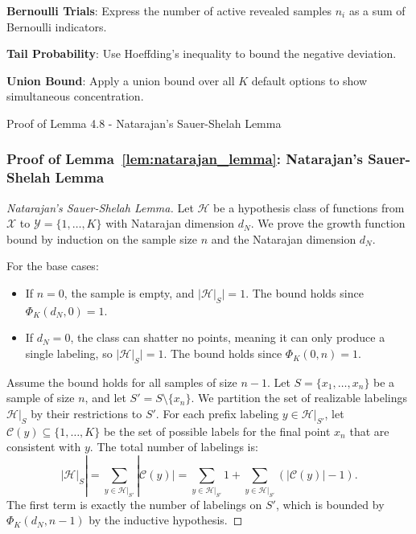 \begin{guideblock}
\item \textbf{Bernoulli Trials}: Express the number of active revealed samples $n_i$ as a sum of Bernoulli indicators.
\item \textbf{Tail Probability}: Use Hoeffding's inequality to bound the negative deviation.
\item \textbf{Union Bound}: Apply a union bound over all $K$ default options to show simultaneous concentration.
\end{guideblock}


\begin{sourceblock}{Proof of Lemma 4.8 - Natarajan's Sauer-Shelah Lemma}
\subsubsection*{Proof of Lemma~\ref{lem:natarajan_lemma}: Natarajan's Sauer-Shelah Lemma}
\label{app:proof_natarajan_lemma}
\begin{proof}[Natarajan's Sauer-Shelah Lemma]
Let $\mathcal{H}$ be a hypothesis class of functions from $\mathcal{X}$ to $\mathcal{Y} = \{1, \dots, K\}$ with Natarajan dimension $d_N$. We prove the growth function bound by induction on the sample size $n$ and the Natarajan dimension $d_N$.

For the base cases:
\begin{itemize}
    \item If $n = 0$, the sample is empty, and $|\mathcal{H}|_S| = 1$. The bound holds since $\Phi_K(d_N, 0) = 1$.
    \item If $d_N = 0$, the class can shatter no points, meaning it can only produce a single labeling, so $|\mathcal{H}|_S| = 1$. The bound holds since $\Phi_K(0, n) = 1$.
\end{itemize}

Assume the bound holds for all samples of size $n - 1$. Let $S = \{x_1, \dots, x_n\}$ be a sample of size $n$, and let $S' = S \setminus \{x_n\}$. We partition the set of realizable labelings $\mathcal{H}|_S$ by their restrictions to $S'$. For each prefix labeling $y \in \mathcal{H}|_{S'}$, let $\mathcal{C}(y) \subseteq \{1, \dots, K\}$ be the set of possible labels for the final point $x_n$ that are consistent with $y$. The total number of labelings is:
\begin{equation}
    |\mathcal{H}|_S| = \sum_{y \in \mathcal{H}|_{S'}} |\mathcal{C}(y)| = \sum_{y \in \mathcal{H}|_{S'}} 1 + \sum_{y \in \mathcal{H}|_{S'}} (|\mathcal{C}(y)| - 1).
\end{equation}
The first term is exactly the number of labelings on $S'$, which is bounded by $\Phi_K(d_N, n - 1)$ by the inductive hypothesis.


\end{proof}
\end{sourceblock}
